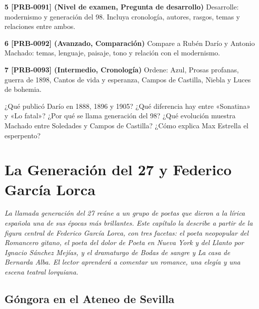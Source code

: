 \documentclass{book}
\begin{document}
\begin{tcolorbox}[title={Ejercicios}, studiumworked, breakable]
\noindent\textbf{5 [PRB-0091] (Nivel de examen, Pregunta de desarrollo)}
Desarrolle: modernismo y generación del 98. Incluya cronología, autores, rasgos, temas y relaciones entre ambos.


\noindent\textbf{6 [PRB-0092] (Avanzado, Comparación)}
Compare a Rubén Darío y Antonio Machado: temas, lenguaje, paisaje, tono y relación con el modernismo.


\noindent\textbf{7 [PRB-0093] (Intermedio, Cronología)}
Ordene: Azul, Prosas profanas, guerra de 1898, Cantos de vida y esperanza, Campos de Castilla, Niebla y Luces de bohemia.

\end{tcolorbox}

\begin{tcolorbox}[title={Autoficha}, studiumcheck, breakable]

¿Qué publicó Darío en 1888, 1896 y 1905? ¿Qué diferencia hay entre «Sonatina» y «Lo fatal»? ¿Por qué se llama generación del 98? ¿Qué evolución muestra Machado entre Soledades y Campos de Castilla? ¿Cómo explica Max Estrella el esperpento?

\end{tcolorbox}

\chapter{La Generación del 27 y Federico García Lorca}
\label{chap:lit-12}

\noindent\textit{La llamada generación del 27 reúne a un grupo de poetas que dieron a la lírica española una de sus épocas más brillantes. Este capítulo la describe a partir de la figura central de Federico García Lorca, con tres facetas: el poeta neopopular del Romancero gitano, el poeta del dolor de Poeta en Nueva York y del Llanto por Ignacio Sánchez Mejías, y el dramaturgo de Bodas de sangre y La casa de Bernarda Alba. El lector aprenderá a comentar un romance, una elegía y una escena teatral lorquiana.}


\section{Góngora en el Ateneo de Sevilla}
\end{document}
